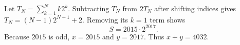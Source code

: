Let $T_N=\sum_{k=1}^N k2^k$. Subtracting $T_N$ from $2T_N$ after shifting indices gives $T_N=(N-1)2^{N+1}+2$. Removing its $k=1$ term shows
\[
S=2015\cdot2^{2017}.
\]
Because $2015$ is odd, $x=2015$ and $y=2017$. Thus $\boxed{x+y=4032}$.
